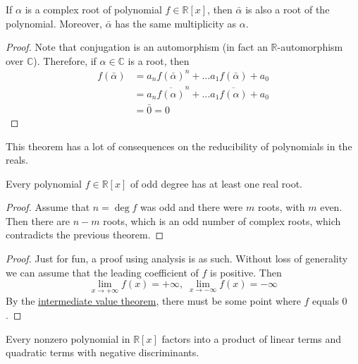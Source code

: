   \begin{theorem}
    \label{thm:complex-roots-come-in-conjugate-pairs}
    If $\alpha$ is a complex root of polynomial $f \in \mathbb{R}[x]$, then $\bar{\alpha}$ is also a root of the polynomial. Moreover, $\bar{\alpha}$ has the same multiplicity as $\alpha$. 
  \end{theorem}
  \begin{proof}
    Note that conjugation is an automorphism (in fact an $\mathbb{R}$-automorphism over $\mathbb{C}$). Therefore, if $\alpha \in \mathbb{C}$ is a root, then 
    \begin{align}
      f(\bar{\alpha}) & = a_n f(\bar{\alpha})^n + \ldots a_1 f(\bar{\alpha}) + a_0 \\ 
                      & = a_n \overline{f(\alpha)}^n + \ldots a_1 \overline{f(\alpha)} + a_0 \\  
                      & = \bar{0} = 0
    \end{align}
  \end{proof}

  This theorem has a lot of consequences on the reducibility of polynomials in the reals. 

  \begin{corollary}
    \label{thm:odd-degree-polynomials-have-at-least-1-real-root}
    Every polynomial $f \in \mathbb{R}[x]$ of odd degree has at least one real root. 
  \end{corollary}
  \begin{proof}
    Assume that $n = \deg{f}$ was odd and there were $m$ roots, with $m$ even. Then there are $n - m$ roots, which is an odd number of complex roots, which contradicts the previous theorem. 
  \end{proof}
  \begin{proof}
    Just for fun, a proof using analysis is as such. Without loss of generality we can assume that the leading coefficient of $f$ is positive. Then
    \begin{equation}
      \lim_{x \rightarrow + \infty} f(x) = + \infty, \; \lim_{x \rightarrow -\infty} f(x) = -\infty
    \end{equation}
    By the \hyperref[pst-thm:intermediate-value-theorem]{intermediate value theorem}, there must be some point where $f$ equals $0$. 
  \end{proof}

  \begin{corollary}
    \label{thm:real-polynomials-factors-into-linear-and}
    Every nonzero polynomial in $\mathbb{R}[x]$ factors into a product of linear terms and quadratic terms with negative discriminants. 
  \end{corollary}

